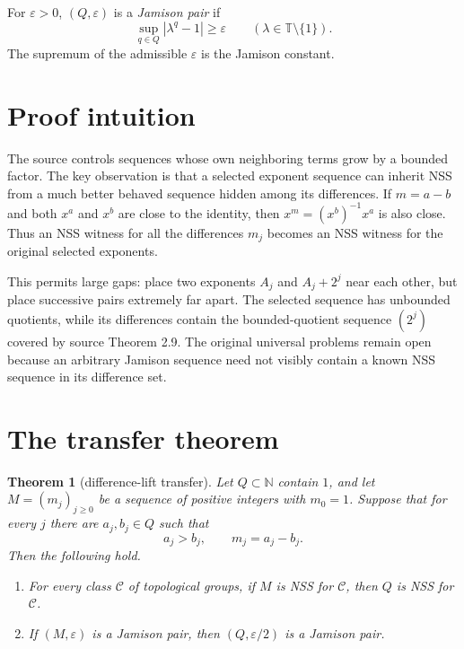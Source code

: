 \documentclass[11pt]{article}
\newtheorem{theorem}{Theorem}
\newcommand{\T}{\mathbb T}
\begin{document}
For $\varepsilon>0$, $(Q,\varepsilon)$ is a \emph{Jamison pair} if
\[
  \sup_{q\in Q}|\lambda^q-1|\ge\varepsilon
  \qquad(\lambda\in\T\setminus\{1\}).
\]
The supremum of the admissible $\varepsilon$ is the Jamison constant.

\section{Proof intuition}

The source controls sequences whose own neighboring terms grow by a bounded
factor.  The key observation is that a selected exponent sequence can inherit
NSS from a much better behaved sequence hidden among its differences.  If
$m=a-b$ and both $x^a$ and $x^b$ are close to the identity, then
$x^m=(x^b)^{-1}x^a$ is also close.  Thus an NSS witness for all the differences
$m_j$ becomes an NSS witness for the original selected exponents.

This permits large gaps: place two exponents $A_j$ and $A_j+2^j$ near each
other, but place successive pairs extremely far apart.  The selected sequence
has unbounded quotients, while its differences contain the bounded-quotient
sequence $(2^j)$ covered by source Theorem 2.9.  The original universal
problems remain open because an arbitrary Jamison sequence need not visibly
contain a known NSS sequence in its difference set.

\section{The transfer theorem}

\begin{theorem}[difference-lift transfer]
Let $Q\subset\mathbb N$ contain $1$, and let $M=(m_j)_{j\ge0}$ be a sequence
of positive integers with $m_0=1$.  Suppose that for every $j$ there are
$a_j,b_j\in Q$ such that
\[
  a_j>b_j,\qquad m_j=a_j-b_j.
\]
Then the following hold.
\begin{enumerate}
\item For every class $\mathcal C$ of topological groups, if $M$ is NSS for
      $\mathcal C$, then $Q$ is NSS for $\mathcal C$.
\item If $(M,\varepsilon)$ is a Jamison pair, then
      $(Q,\varepsilon/2)$ is a Jamison pair.
\end{enumerate}
\end{theorem}
\end{document}
